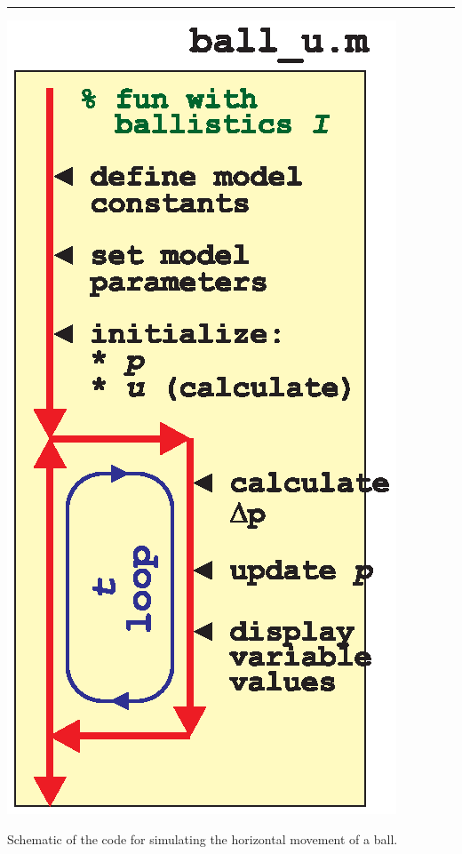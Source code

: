 \documentclass{tufte-book} %
\begin{document}
\noindent\rule[0.0ex]{0.5\linewidth}{0.5pt}

\begin{marginfigure}[-0.0in]
\includegraphics[width=\linewidth]{ch9-schematic-ball_u.eps}
\caption{Schematic of the code for simulating the horizontal movement of a ball.}
\label{fig:ch9-schematic-ball_u}
\end{marginfigure}
\end{document}
